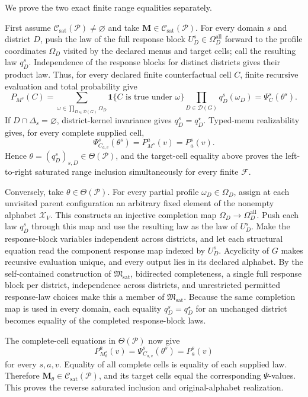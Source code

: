 We prove the two exact finite range equalities separately.

First assume \(\mathcal C_{\mathrm{sat}}(\mathcal P)\ne\varnothing\) and take \(\mathbf M\in\mathcal C_{\mathrm{sat}}(\mathcal P)\). For every domain \(s\) and district \(D\), push the law of the full response block \(U_D^s\in\Omega_D^{\mathrm{all}}\) forward to the profile coordinates \(\Omega_D\) visited by the declared menus and target cells; call the resulting law \(q_D^s\). Independence of the response blocks for distinct districts gives their product law. Thus, for every declared finite counterfactual cell \(C\), finite recursive evaluation and total probability give
\[
P_{M^s}(C)
=\sum_{\omega\in\prod_{D\in\mathcal D(G)}\Omega_D}
\mathbf 1\{C\text{ is true under }\omega\}
\prod_{D\in\mathcal D(G)}q_D^s(\omega_D)
=\Psi_C^s(\theta^s).
\]
If \(D\cap\Delta_s=\varnothing\), district-kernel invariance gives \(q_D^s=q_D^\star\). Typed-menu realizability gives, for every complete supplied cell,
\[
\Psi_{C_{a,v}}^s(\theta^s)=P_{M^s}^{a}(v)=P_a^s(v).
\]
Hence \(\theta=(q_D^s)_{s,D}\in\Theta(\mathcal P)\), and the target-cell equality above proves the left-to-right saturated range inclusion simultaneously for every finite \(\mathcal F\).

Conversely, take \(\theta\in\Theta(\mathcal P)\). For every partial profile \(\omega_D\in\Omega_D\), assign at each unvisited parent configuration an arbitrary fixed element of the nonempty alphabet \(\mathcal X_V\). This constructs an injective completion map \(\Omega_D\to\Omega_D^{\mathrm{all}}\). Push each law \(q_D^s\) through this map and use the resulting law as the law of \(U_D^s\). Make the response-block variables independent across districts, and let each structural equation read the component response map indexed by \(U_D^s\). Acyclicity of \(G\) makes recursive evaluation unique, and every output lies in its declared alphabet. By the self-contained construction of \(\mathfrak M_{\mathrm{sat}}\), bidirected completeness, a single full response block per district, independence across districts, and unrestricted permitted response-law choices make this a member of \(\mathfrak M_{\mathrm{sat}}\). Because the same completion map is used in every domain, each equality \(q_D^s=q_D^\star\) for an unchanged district becomes equality of the completed response-block laws.

The complete-cell equations in \(\Theta(\mathcal P)\) now give
\[
P_{M_\theta^s}^{a}(v)
=\Psi_{C_{a,v}}^s(\theta^s)
=P_a^s(v)
\]
for every \(s,a,v\). Equality of all complete cells is equality of each supplied law. Therefore \(\mathbf M_\theta\in\mathcal C_{\mathrm{sat}}(\mathcal P)\), and its target cells equal the corresponding \(\Psi\)-values. This proves the reverse saturated inclusion and original-alphabet realization.

